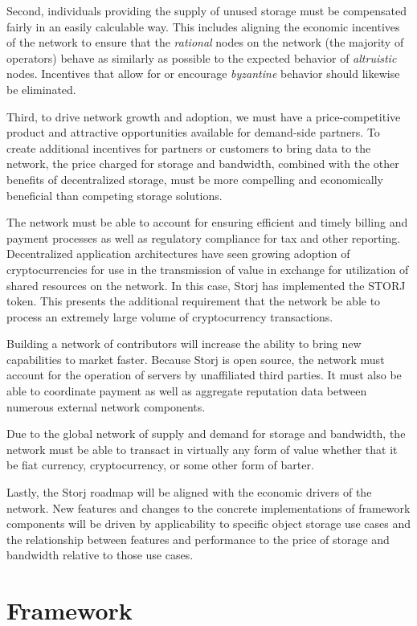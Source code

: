 \documentclass[11pt,fleqn,openany]{book}
\begin{document}
Second, individuals providing the supply of unused storage must
be compensated fairly in an easily calculable way.
This includes aligning the economic incentives of the network to ensure
that the {\em rational} nodes on the network (the majority of operators) behave
as similarly as possible to the expected behavior of {\em altruistic} nodes.
Incentives that allow for or encourage {\em byzantine} behavior should likewise
be eliminated.

Third, to drive network growth and adoption, we must have a price-competitive
product and attractive
opportunities available for demand-side partners. To create additional
incentives for partners or customers to bring data to the network,
the price charged for storage and bandwidth, combined with the other
benefits of decentralized storage, must be
more compelling and economically beneficial than competing storage solutions.

The network must be able to account for ensuring efficient and timely billing
and payment processes as well as regulatory compliance for tax and other reporting.
Decentralized application architectures have seen growing adoption of
cryptocurrencies for use in the transmission of value in
exchange for utilization of shared resources on the network.
In this case, Storj has implemented the STORJ token.
This presents the additional requirement that the network be able to process
an extremely large volume of cryptocurrency transactions.

Building a network of contributors will increase the ability to bring new
capabilities to market faster.
Because Storj is open source, the network must account for the operation of
servers by unaffiliated third parties. It must also be able to coordinate payment
as well as aggregate reputation data between numerous external network
components.

Due to the global network of supply and demand for storage and bandwidth, the
network must be able to transact in virtually any form of value whether that it
be fiat currency, cryptocurrency, or some other form of barter.

Lastly, the Storj roadmap will be aligned with the economic drivers of the
network.
New features and changes to the concrete implementations of framework
components will be driven by applicability to specific object storage use cases
and the relationship between features and performance to the price of storage
and bandwidth relative to those use cases.

\chapter{Framework}\label{chap:framework}
\end{document}
